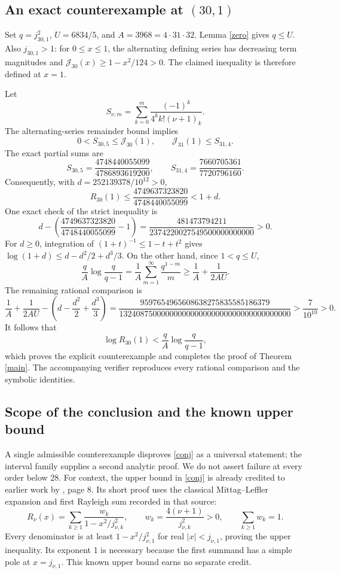\documentclass[11pt]{article}
\newcommand{\J}{\mathcal J}
\begin{document}
\subsection*{An exact counterexample at \((30,1)\)}
Set \(q=j_{30,1}^2\), \(U=6834/5\), and \(A=3968=4\cdot31\cdot32\).
Lemma \ref{zero} gives \(q\le U\). Also \(j_{30,1}>1\):
for \(0\le x\le1\), the alternating defining series has decreasing
term magnitudes and
\(\J_{30}(x)\ge1-x^2/124>0\).
The claimed inequality is therefore defined at \(x=1\).

Let
\[
 S_{\nu,m}=\sum_{k=0}^m\frac{(-1)^k}{4^k k!(\nu+1)_k}.
\]
The alternating-series remainder bound implies
\[
 0<S_{30,5}\le\J_{30}(1),\qquad
 \J_{31}(1)\le S_{31,4}.
\]
The exact partial sums are
\[
 S_{30,5}=\frac{4748440055099}{4786893619200},
 \qquad S_{31,4}=\frac{7660705361}{7720796160}.
\]
Consequently, with \(d=252139378/10^{12}>0\),
\[
 R_{30}(1)\le
 \frac{4749637323820}{4748440055099}<1+d.
\]
One exact check of the strict inequality is
\[
 d-\left(\frac{4749637323820}{4748440055099}-1\right)
 =\frac{481473794211}{2374220027549500000000000}>0.
\]
For \(d\ge0\), integration of
\((1+t)^{-1}\le1-t+t^2\) gives
\(\log(1+d)\le d-d^2/2+d^3/3\). On the other hand, since
\(1<q\le U\),
\[
 \frac qA\log\frac q{q-1}
 =\frac1A\sum_{m=1}^\infty\frac{q^{1-m}}m
 \ge\frac1A+\frac1{2AU}.
\]
The remaining rational comparison is
\[
 \frac1A+\frac1{2AU}
       -\left(d-\frac{d^2}{2}+\frac{d^3}{3}\right)
 =\frac{9597654965608638275835585186379}
 {13240875000000000000000000000000000000000}
 >\frac7{10^{10}}>0.
\]
It follows that
\[
 \log R_{30}(1)<\frac qA\log\frac q{q-1},
\]
which proves the explicit counterexample and completes the proof
of Theorem \ref{main}. The accompanying verifier reproduces every
rational comparison and the symbolic identities.

\subsection*{Scope of the conclusion and the known upper bound}
A single admissible counterexample disproves \eqref{conj} as a universal
statement; the interval family supplies a second analytic proof.
We do not assert failure at every order below 28.
For context, the upper bound in \eqref{conj} is already credited
to earlier work by \cite{BM}, page 8.
Its short proof uses the classical Mittag--Leffler expansion
and first Rayleigh sum recorded in that source:
\[
 R_\nu(x)=\sum_{k\ge1}
 \frac{w_k}{1-x^2/j_{\nu,k}^2},\qquad
 w_k=\frac{4(\nu+1)}{j_{\nu,k}^2}>0,\qquad \sum_{k\ge1}w_k=1.
\]
Every denominator is at least \(1-x^2/j_{\nu,1}^2\) for real
\(|x|<j_{\nu,1}\), proving the upper inequality. Its exponent 1
is necessary because the first summand has a simple pole at
\(x=j_{\nu,1}\). This known upper bound earns no separate credit.
\end{document}
